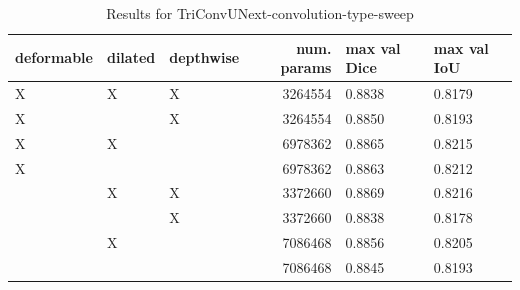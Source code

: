 \begin{table}
\caption{Results for TriConvUNext-convolution-type-sweep}
\label{tab-TriConvUNext-convolution-type-sweep_table}
\begin{tabular}{lllrll}
\toprule
deformable & dilated & depthwise & num. params & max val Dice & max val IoU \\
\midrule
X & X & X & 3264554 & 0.8838 & 0.8179 \\
X &  & X & 3264554 & 0.8850 & 0.8193 \\
X & X &  & 6978362 & 0.8865 & 0.8215 \\
X &  &  & 6978362 & 0.8863 & 0.8212 \\
 & X & X & 3372660 & 0.8869 & 0.8216 \\
 &  & X & 3372660 & 0.8838 & 0.8178 \\
 & X &  & 7086468 & 0.8856 & 0.8205 \\
 &  &  & 7086468 & 0.8845 & 0.8193 \\
\bottomrule
\end{tabular}
\end{table}
